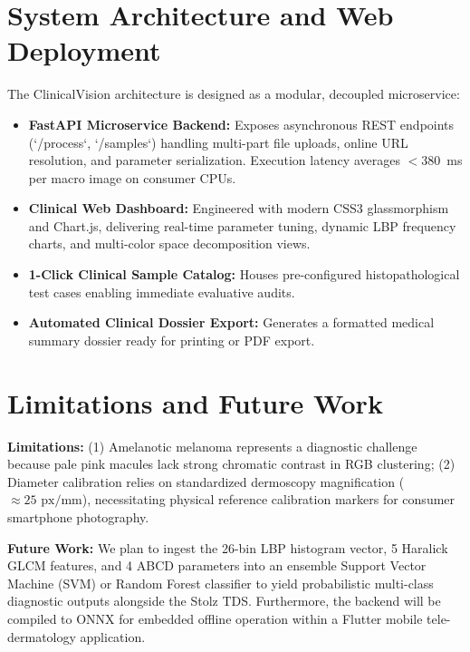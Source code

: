 \documentclass[conference]{IEEEtran}
\begin{document}
\section{System Architecture and Web Deployment}
The ClinicalVision architecture is designed as a modular, decoupled microservice:
\begin{itemize}
    \item \textbf{FastAPI Microservice Backend:} Exposes asynchronous REST endpoints (`/process`, `/samples`) handling multi-part file uploads, online URL resolution, and parameter serialization. Execution latency averages $<380$~ms per macro image on consumer CPUs.
    \item \textbf{Clinical Web Dashboard:} Engineered with modern CSS3 glassmorphism and Chart.js, delivering real-time parameter tuning, dynamic LBP frequency charts, and multi-color space decomposition views.
    \item \textbf{1-Click Clinical Sample Catalog:} Houses pre-configured histopathological test cases enabling immediate evaluative audits.
    \item \textbf{Automated Clinical Dossier Export:} Generates a formatted medical summary dossier ready for printing or PDF export.
\end{itemize}

\section{Limitations and Future Work}
\textbf{Limitations:} (1) Amelanotic melanoma represents a diagnostic challenge because pale pink macules lack strong chromatic contrast in RGB clustering; (2) Diameter calibration relies on standardized dermoscopy magnification ($\approx 25\text{ px/mm}$), necessitating physical reference calibration markers for consumer smartphone photography.

\textbf{Future Work:} We plan to ingest the 26-bin LBP histogram vector, 5 Haralick GLCM features, and 4 ABCD parameters into an ensemble Support Vector Machine (SVM) or Random Forest classifier to yield probabilistic multi-class diagnostic outputs alongside the Stolz TDS. Furthermore, the backend will be compiled to ONNX for embedded offline operation within a Flutter mobile tele-dermatology application.

\end{document}
